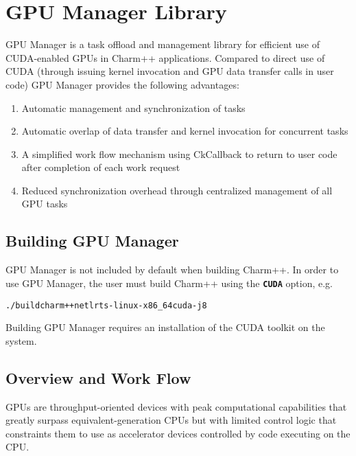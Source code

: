 \documentclass[10pt]{report}
\begin{document}
  \chapter{GPU Manager Library}

  \newcommand{\charmpp}{Charm++}
  \newcommand{\code}[1]{\texttt{\textbf{#1}}} %
\else
  \renewcommand{\code}[1]{\texttt{\textbf{#1}}} %
\fi

\newcommand{\cuda}{\code{CUDA}}

GPU Manager is a task offload and management library for efficient use of
CUDA-enabled GPUs in \charmpp{} applications. Compared to direct use of CUDA
(through issuing kernel invocation and GPU data transfer calls in user
code) GPU Manager provides the following advantages:
\begin{enumerate}
\item Automatic management and synchronization of tasks
\item Automatic overlap of data transfer and kernel invocation for concurrent tasks
\item A simplified work flow mechanism using CkCallback to return to user code after completion of each work request
\item Reduced synchronization overhead through centralized management of all GPU tasks
\end{enumerate}

\section{Building GPU Manager}

GPU Manager is not included by default when building \charmpp{}. In order to use
GPU Manager, the user must build \charmpp{} using the \cuda{} option, e.g.

\begin{alltt}
./build charm++ netlrts-linux-x86_64 cuda -j8
\end{alltt}
Building GPU Manager requires an installation of the CUDA toolkit on the system.

\section{Overview and Work Flow}

GPUs are throughput-oriented devices with peak computational capabilities that
greatly surpass equivalent-generation CPUs but with limited control logic that
constraints them to use as accelerator devices controlled by code executing on
the CPU.
\end{document}
